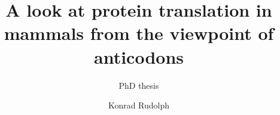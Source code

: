 \documentclass{thesis}
\begin{document}
\title{A look at protein translation in mammals from the viewpoint of anticodons}
\subtitle{PhD thesis}
\author{Konrad  Rudolph}
\maketitle




\end{document}
